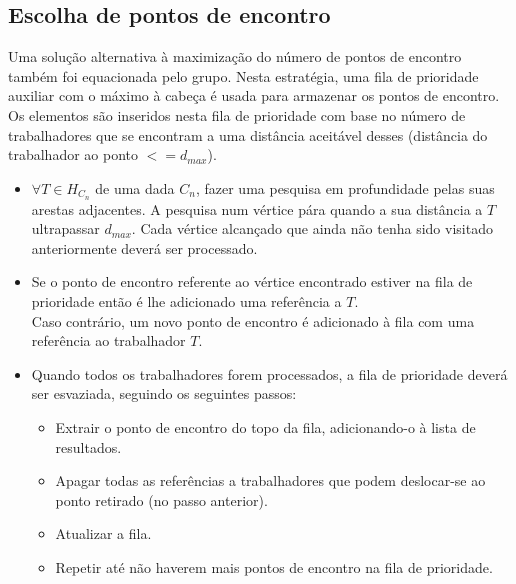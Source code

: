 \documentclass{report}
\begin{document}
    \subsection{Escolha de pontos de encontro}
      Uma solução alternativa à maximização do número de pontos de encontro
      também foi equacionada pelo grupo. Nesta estratégia, uma fila de 
      prioridade auxiliar com o máximo à cabeça é usada para armazenar os pontos
      de encontro. Os elementos são inseridos nesta fila de prioridade com base
      no número de trabalhadores que se encontram a uma distância aceitável desses
      (distância do trabalhador ao ponto $<= d_{max}$).
      \begin{itemize}
      \item $\forall{T \in H_{C_n}}$ de uma dada $C_n$, fazer uma pesquisa em
        profundidade pelas suas arestas adjacentes. A pesquisa num vértice pára
        quando a sua distância a $T$ ultrapassar $d_{max}$. Cada vértice alcançado
        que ainda não tenha sido visitado anteriormente deverá ser processado.
      \item Se o ponto de encontro referente ao vértice encontrado estiver na
        fila de prioridade então é lhe adicionado uma referência a $T$.\\
        Caso contrário, um novo ponto de encontro é adicionado à fila com uma
        referência ao trabalhador $T$.
      \item Quando todos os trabalhadores forem processados, a fila de prioridade
        deverá ser esvaziada, seguindo os seguintes passos:
        \begin{itemize}
        \item Extrair o ponto de encontro do topo da fila, adicionando-o à lista
          de resultados.
        \item Apagar todas as referências a trabalhadores que podem deslocar-se ao
          ponto retirado (no passo anterior).
        \item Atualizar a fila.
        \item Repetir até não haverem mais pontos de encontro na fila de prioridade.
        \end{itemize}
      \end{itemize}
\end{document}
